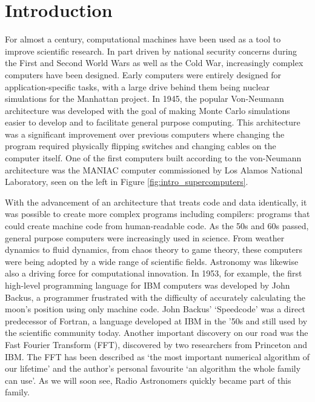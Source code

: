 \section{Introduction}\label{sec:intro_intro}

For almost a century, computational machines have been used as a tool to improve scientific research. In part driven by national security concerns during the First and Second World Wars as well as the Cold War, increasingly complex computers have been designed. Early computers were entirely designed for application-specific tasks, with a large drive behind them being nuclear simulations for the Manhattan project. In 1945, the popular Von-Neumann architecture was developed with the goal of making Monte Carlo simulations easier to develop and to facilitate general purpose computing. This architecture was a significant improvement over previous computers where changing the program required physically flipping switches and changing cables on the computer itself. One of the first computers built according to the von-Neumann architecture was the MANIAC computer commissioned by Los Alamos National Laboratory, seen on the left in Figure \ref{fig:intro_supercomputers}.

With the advancement of an architecture that treats code and data identically, it was possible to create more complex programs including compilers: programs that could create machine code from human-readable code. As the 50s and 60s passed, general purpose computers were increasingly used in science. From weather dynamics to fluid dynamics, from chaos theory to game theory, these computers were being adopted by a wide range of scientific fields. Astronomy was likewise also a driving force for computational innovation. In 1953, for example, the first high-level programming language for IBM computers was developed by John Backus, a programmer frustrated with the difficulty of accurately calculating the moon's position using only machine code. John Backus' `Speedcode' was a direct predecessor of Fortran, a language developed at IBM in the '50s and still used by the scientific community today. Another important discovery on our road was the Fast Fourier Transform (FFT), discovered by two researchers from Princeton and IBM. The FFT has been described as `the most important numerical algorithm of our lifetime' and the author's personal favourite `an algorithm the whole family can use'\citep{top_10_algos}. As we will soon see, Radio Astronomers quickly became part of this family.

